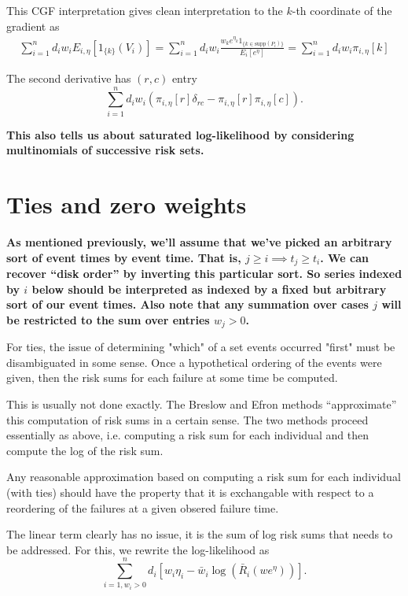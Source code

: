 \documentclass{article}
\begin{document}
This CGF interpretation gives clean interpretation
to the $k$-th coordinate of the gradient as
$$
\begin{aligned}
    \sum_{i=1}^n d_i w_i E_{i,\eta}[1_{\{k\}}(V_i)] = 
\sum_{i=1}^n d_i w_i \frac{w_k e^{\eta_k} 1_{\{k \in \text{supp}(P_i)\}}}{E_i[e^\eta]} = \sum_{i=1}^n d_i w_i \pi_{i,\eta}[k]
\end{aligned}
$$

The second derivative has $(r,c)$ entry
$$
\sum_{i=1}^n d_i w_i\left( \pi_{i,\eta}[r] \delta_{rc} - 
\pi_{i,\eta}[r] \pi_{i,\eta}[c] \right).
$$

{\bf This also tells us about saturated log-likelihood by considering multinomials of successive risk sets.}

\section{Ties and zero weights}

{\bf As mentioned previously, we'll assume that we've picked an arbitrary
sort of event times
by event time. That is, $j \geq i \implies t_j \geq t_i$. We can recover ``disk order''
by inverting this particular sort. So series indexed by $i$
below should be interpreted as indexed by a fixed but arbitrary
sort of our event times. Also note that any summation over cases $j$ will be restricted
to the sum over entries $w_j > 0$.}

For ties, the issue of determining "which" of a set events occurred "first" must be disambiguated in some sense. Once a 
hypothetical ordering of the events were given, then the
risk sums for each failure at some time be computed.

This is usually not done exactly. The Breslow and Efron methods
``approximate'' this computation of risk sums in a certain sense. 
The two methods proceed essentially as above, i.e.
computing a risk sum for each individual and then
compute the log of the risk sum.

Any reasonable approximation based on computing
a risk sum for each individual (with ties) should have the property
that it is exchangable with respect to a reordering of the
failures at a given obsered failure time. 

The linear term clearly has no issue,
it is the sum of log risk sums that needs to be addressed. For this, we rewrite the log-likelihood as
$$
\sum_{i=1, w_i > 0}^n d_i \left[w_i  \eta_i - \bar{w}_i \log \left( \bar{R}_i(we^{\eta}) \right) \right].
$$
\end{document}
